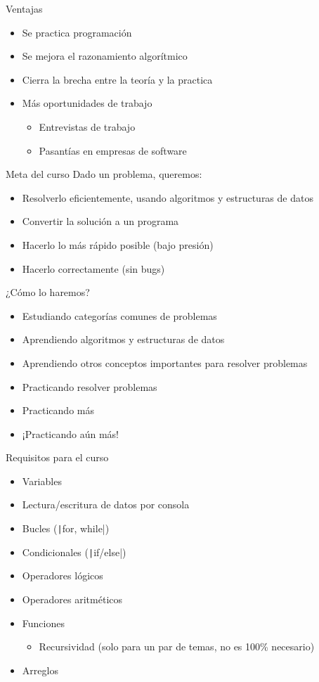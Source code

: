 \documentclass[10pt]{beamer}
\newcommand{\bi}{\begin{itemize}}
\newcommand{\ei}{\end{itemize}}
\begin{document}
\begin{frame}{Ventajas}
    \bi
        \item Se practica programación
        \item Se mejora el razonamiento algorítmico
        \item Cierra la brecha entre la teoría y la practica
        \item Más oportunidades de trabajo
        \bi
            \item Entrevistas de trabajo
            \item Pasantías en empresas de software
        \ei
    \ei
\end{frame}

\begin{frame}{Meta del curso}
    Dado un problema, queremos:
    \bi
        \item Resolverlo eficientemente, usando algoritmos y estructuras de datos
        \item Convertir la solución a un programa
        \item Hacerlo lo más rápido posible (bajo presión)
        \item Hacerlo correctamente (sin bugs)
    \ei
\end{frame}

\begin{frame}{¿Cómo lo haremos?}
    \bi
        \item Estudiando categorías comunes de problemas
        \item Aprendiendo algoritmos y estructuras de datos
        \item Aprendiendo otros conceptos importantes para resolver problemas
        \item Practicando resolver problemas
        \item Practicando más
        \item ¡Practicando aún más!
    \ei
\end{frame}

\begin{frame}{Requisitos para el curso}
    \bi
        \item Variables
        \item Lectura/escritura de datos por consola
        \item Bucles (\texttt|for, while|)
        \item Condicionales (\texttt|if/else|)
        \item Operadores lógicos
        \item Operadores aritméticos
        \item Funciones
        \bi 
            \item Recursividad (solo para un par de temas, no es 100\% necesario)
        \ei
        \item Arreglos
    \ei
\end{frame}
\end{document}
